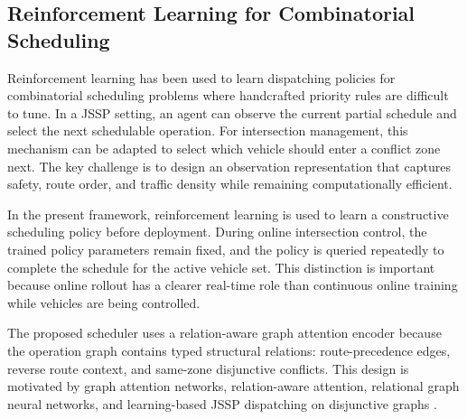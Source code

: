 \subsection{Reinforcement Learning for Combinatorial Scheduling}
Reinforcement learning has been used to learn dispatching policies for combinatorial scheduling problems where handcrafted priority rules are difficult to tune. In a JSSP setting, an agent can observe the current partial schedule and select the next schedulable operation. For intersection management, this mechanism can be adapted to select which vehicle should enter a conflict zone next. The key challenge is to design an observation representation that captures safety, route order, and traffic density while remaining computationally efficient.

\begin{addedblock}
In the present framework, reinforcement learning is used to learn a constructive scheduling policy before deployment. During online intersection control, the trained policy parameters remain fixed, and the policy is queried repeatedly to complete the schedule for the active vehicle set. This distinction is important because online rollout has a clearer real-time role than continuous online training while vehicles are being controlled.
\end{addedblock}

\begin{addedtwoblock}
The proposed scheduler uses a relation-aware graph attention encoder because the operation graph contains typed structural relations: route-precedence edges, reverse route context, and same-zone disjunctive conflicts. This design is motivated by graph attention networks, relation-aware attention, relational graph neural networks, and learning-based JSSP dispatching on disjunctive graphs \cite{velickovic2018graphattention,shaw2018selfattention,schlichtkrull2018rgcn,chen2021rgat,zhang2020learningdispatch}.
\end{addedtwoblock}
